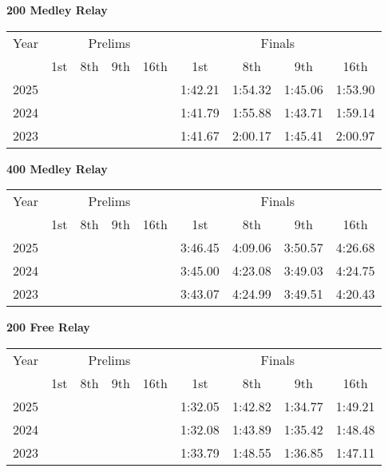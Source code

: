 \textbf{200 Medley Relay}

\begin{flushleft}
\begin{tabular}{|c|c|c|c|c|c|c|c|c|}
\hline
Year & \multicolumn{4}{c|}{Prelims} & \multicolumn{4}{c|}{Finals} \\
\cline{2-9}
& 1st & 8th & 9th & 16th & 1st & 8th & 9th & 16th \\
\hline
2025 &  &  &  &  & 1:42.21 & 1:54.32 & 1:45.06 & 1:53.90 \\
2024 &  &  &  &  & 1:41.79 & 1:55.88 & 1:43.71 & 1:59.14 \\
2023 &  &  &  &  & 1:41.67 & 2:00.17 & 1:45.41 & 2:00.97 \\
\hline
\end{tabular}
\end{flushleft}

\textbf{400 Medley Relay}

\begin{flushleft}
\begin{tabular}{|c|c|c|c|c|c|c|c|c|}
\hline
Year & \multicolumn{4}{c|}{Prelims} & \multicolumn{4}{c|}{Finals} \\
\cline{2-9}
& 1st & 8th & 9th & 16th & 1st & 8th & 9th & 16th \\
\hline
2025 &  &  &  &  & 3:46.45 & 4:09.06 & 3:50.57 & 4:26.68 \\
2024 &  &  &  &  & 3:45.00 & 4:23.08 & 3:49.03 & 4:24.75 \\
2023 &  &  &  &  & 3:43.07 & 4:24.99 & 3:49.51 & 4:20.43 \\
\hline
\end{tabular}
\end{flushleft}

\textbf{200 Free Relay}

\begin{flushleft}
\begin{tabular}{|c|c|c|c|c|c|c|c|c|}
\hline
Year & \multicolumn{4}{c|}{Prelims} & \multicolumn{4}{c|}{Finals} \\
\cline{2-9}
& 1st & 8th & 9th & 16th & 1st & 8th & 9th & 16th \\
\hline
2025 &  &  &  &  & 1:32.05 & 1:42.82 & 1:34.77 & 1:49.21 \\
2024 &  &  &  &  & 1:32.08 & 1:43.89 & 1:35.42 & 1:48.48 \\
2023 &  &  &  &  & 1:33.79 & 1:48.55 & 1:36.85 & 1:47.11 \\
\hline
\end{tabular}
\end{flushleft}

